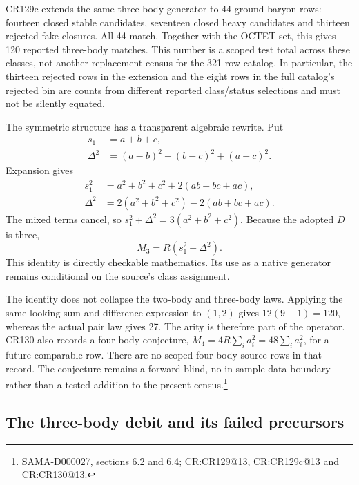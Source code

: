 CR129c extends the same three-body generator to 44 ground-baryon rows: fourteen closed stable candidates, seventeen closed heavy candidates and thirteen rejected fake closures. All 44 match. Together with the OCTET set, this gives 120 reported three-body matches. This number is a scoped test total across these classes, not another replacement census for the 321-row catalog. In particular, the thirteen rejected rows in the extension and the eight rows in the full catalog's rejected bin are counts from different reported class/status selections and must not be silently equated.

The symmetric structure has a transparent algebraic rewrite. Put
\begin{equation}
\begin{aligned}
 s_1&=a+b+c,\\
 \Delta^2&=(a-b)^2+(b-c)^2+(a-c)^2.
\end{aligned}
\end{equation}
Expansion gives
\begin{equation}
\begin{split}
s_1^2&=a^2+b^2+c^2+2(ab+bc+ac),\\
\Delta^2&=2(a^2+b^2+c^2)-2(ab+bc+ac).
\end{split}
\end{equation}
The mixed terms cancel, so $s_1^2+\Delta^2=3(a^2+b^2+c^2)$. Because the adopted $D$ is three,
\begin{equation}
M_3=R(s_1^2+\Delta^2).
\label{v2c2:triplebridge}
\end{equation}
This identity is directly checkable mathematics. Its use as a native generator remains conditional on the source's class assignment.

The identity does not collapse the two-body and three-body laws. Applying the same-looking sum-and-difference expression to $(1,2)$ gives $12(9+1)=120$, whereas the actual pair law gives 27. The arity is therefore part of the operator. CR130 also records a four-body conjecture, $M_4=4R\sum_i a_i^2=48\sum_i a_i^2$, for a future comparable row. There are no scoped four-body source rows in that record. The conjecture remains a forward-blind, no-in-sample-data boundary rather than a tested addition to the present census.\footnote{SAMA-D000027, sections 6.2 and 6.4; CR:CR129@13, CR:CR129c@13 and CR:CR130@13.}

\subsection{The three-body debit and its failed precursors}

